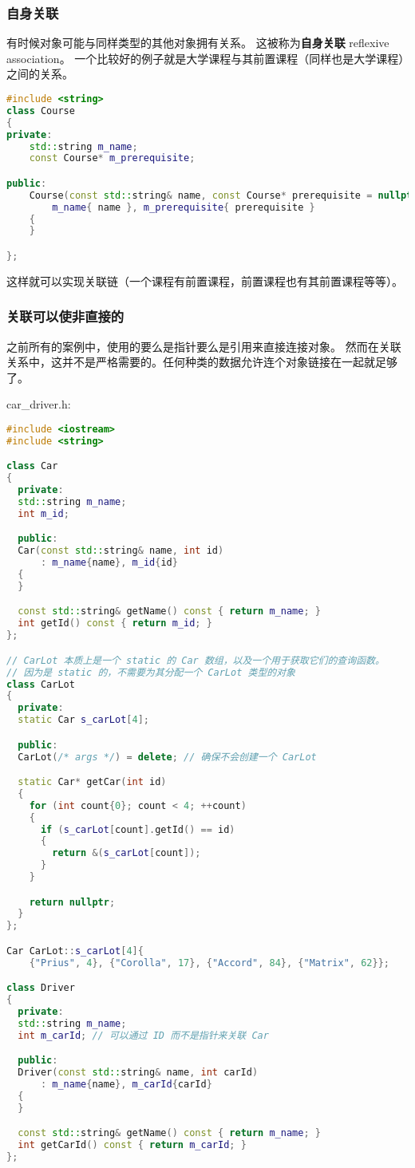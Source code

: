 \documentclass[../../LearnCpp.tex]{subfiles}
\begin{document}
\subsubsection*{自身关联}

有时候对象可能与同样类型的其他对象拥有关系。
这被称为\textbf{自身关联} reflexive association。
一个比较好的例子就是大学课程与其前置课程（同样也是大学课程）之间的关系。

\begin{lstlisting}[language=C++]
#include <string>
class Course
{
private:
    std::string m_name;
    const Course* m_prerequisite;

public:
    Course(const std::string& name, const Course* prerequisite = nullptr):
        m_name{ name }, m_prerequisite{ prerequisite }
    {
    }

};
\end{lstlisting}

这样就可以实现关联链（一个课程有前置课程，前置课程也有其前置课程等等）。

\subsubsection*{关联可以使非直接的}

之前所有的案例中，使用的要么是指针要么是引用来直接连接对象。
然而在关联关系中，这并不是严格需要的。任何种类的数据允许连个对象链接在一起就足够了。

car\_driver.h:

\begin{lstlisting}[language=C++]
#include <iostream>
#include <string>

class Car
{
  private:
  std::string m_name;
  int m_id;

  public:
  Car(const std::string& name, int id)
      : m_name{name}, m_id{id}
  {
  }

  const std::string& getName() const { return m_name; }
  int getId() const { return m_id; }
};

// CarLot 本质上是一个 static 的 Car 数组，以及一个用于获取它们的查询函数。
// 因为是 static 的，不需要为其分配一个 CarLot 类型的对象
class CarLot
{
  private:
  static Car s_carLot[4];

  public:
  CarLot(/* args */) = delete; // 确保不会创建一个 CarLot

  static Car* getCar(int id)
  {
    for (int count{0}; count < 4; ++count)
    {
      if (s_carLot[count].getId() == id)
      {
        return &(s_carLot[count]);
      }
    }

    return nullptr;
  }
};

Car CarLot::s_carLot[4]{
    {"Prius", 4}, {"Corolla", 17}, {"Accord", 84}, {"Matrix", 62}};

class Driver
{
  private:
  std::string m_name;
  int m_carId; // 可以通过 ID 而不是指针来关联 Car

  public:
  Driver(const std::string& name, int carId)
      : m_name{name}, m_carId{carId}
  {
  }

  const std::string& getName() const { return m_name; }
  int getCarId() const { return m_carId; }
};
\end{lstlisting}
\end{document}
